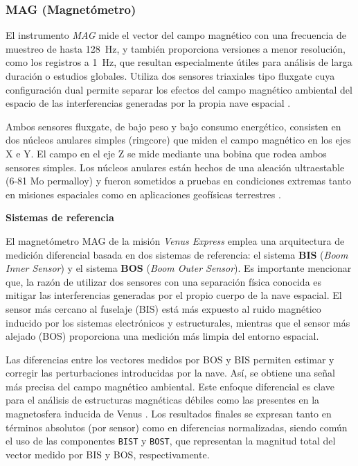 \documentclass[letterpaper,11pt]{article}
\begin{document}
            \subsubsection{MAG (Magnetómetro)}
                El instrumento \textit{MAG} mide el vector del campo magnético con una frecuencia de muestreo de hasta 128~Hz, y también proporciona versiones a menor resolución, como los registros a 1~Hz, que resultan especialmente útiles para análisis de larga duración o estudios globales. Utiliza dos sensores triaxiales tipo fluxgate cuya configuración dual permite separar los efectos del campo magnético ambiental del espacio de las interferencias generadas por la propia nave espacial \cite{esa2}.


                Ambos sensores fluxgate, de bajo peso y bajo consumo energético, consisten en dos núcleos anulares simples (ringcore) que miden el campo magnético en los ejes X e Y. El campo en el eje Z se mide mediante una bobina que rodea ambos sensores simples. Los núcleos anulares están hechos de una aleación ultraestable (6-81 Mo permalloy) y fueron sometidos a pruebas en condiciones extremas tanto en misiones espaciales como en aplicaciones geofísicas terrestres \cite{esa2}.


                \textbf{Sistemas de referencia}

                    El magnetómetro MAG de la misión \textit{Venus Express} emplea una arquitectura de medición diferencial basada en dos sistemas de referencia: el sistema \textbf{BIS} (\textit{Boom Inner Sensor}) y el sistema \textbf{BOS} (\textit{Boom Outer Sensor}). Es importante mencionar que, la razón de utilizar dos sensores con una separación física conocida es mitigar las interferencias generadas por el propio cuerpo de la nave espacial. El sensor más cercano al fuselaje (BIS) está más expuesto al ruido magnético inducido por los sistemas electrónicos y estructurales, mientras que el sensor más alejado (BOS) proporciona una medición más limpia del entorno espacial. 

                    Las diferencias entre los vectores medidos por BOS y BIS permiten estimar y corregir las perturbaciones introducidas por la nave. Así, se obtiene una señal más precisa del campo magnético ambiental. Este enfoque diferencial es clave para el análisis de estructuras magnéticas débiles como las presentes en la magnetosfera inducida de Venus \cite{esa}. Los resultados finales se expresan tanto en términos absolutos (por sensor) como en diferencias normalizadas, siendo común el uso de las componentes \texttt{BIST} y \texttt{BOST}, que representan la magnitud total del vector medido por BIS y BOS, respectivamente.
\end{document}
